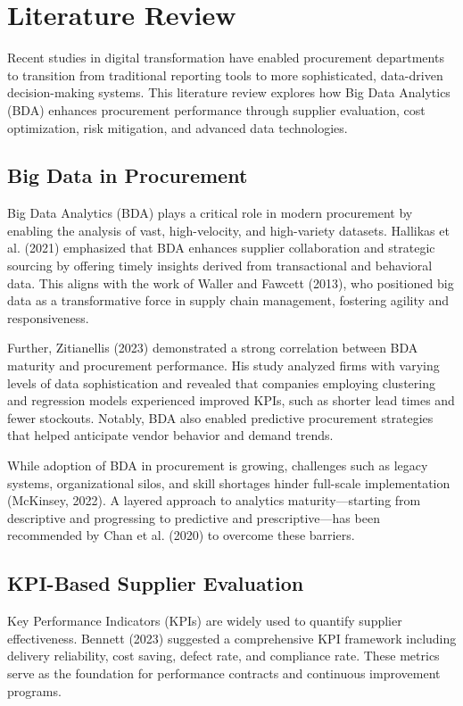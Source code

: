 \documentclass[10pt, twocolumn]{article}
\begin{document}
 
\section{Literature Review }

Recent studies in digital transformation have enabled procurement departments to transition from traditional reporting tools to more sophisticated, data-driven decision-making systems. This literature review explores how Big Data Analytics (BDA) enhances procurement performance through supplier evaluation, cost optimization, risk mitigation, and advanced data technologies.

\subsection{Big Data in Procurement}
Big Data Analytics (BDA) plays a critical role in modern procurement by enabling the analysis of vast, high-velocity, and high-variety datasets. Hallikas et al. (2021) emphasized that BDA enhances supplier collaboration and strategic sourcing by offering timely insights derived from transactional and behavioral data. This aligns with the work of Waller and Fawcett (2013), who positioned big data as a transformative force in supply chain management, fostering agility and responsiveness.

Further, Zitianellis (2023) demonstrated a strong correlation between BDA maturity and procurement performance. His study analyzed firms with varying levels of data sophistication and revealed that companies employing clustering and regression models experienced improved KPIs, such as shorter lead times and fewer stockouts. Notably, BDA also enabled predictive procurement strategies that helped anticipate vendor behavior and demand trends.

While adoption of BDA in procurement is growing, challenges such as legacy systems, organizational silos, and skill shortages hinder full-scale implementation (McKinsey, 2022). A layered approach to analytics maturity—starting from descriptive and progressing to predictive and prescriptive—has been recommended by Chan et al. (2020) to overcome these barriers.

\subsection{KPI-Based Supplier Evaluation}
Key Performance Indicators (KPIs) are widely used to quantify supplier effectiveness. Bennett (2023) suggested a comprehensive KPI framework including delivery reliability, cost saving, defect rate, and compliance rate. These metrics serve as the foundation for performance contracts and continuous improvement programs.
\end{document}
